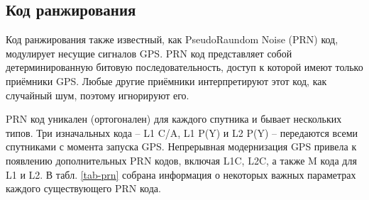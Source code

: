 \subsection*{\textbf{Код ранжирования}}

Код ранжирования также известный, как PseudoRaundom Noise (PRN) код, модулирует несущие сигналов GPS.
PRN код представляет собой детерминированную битовую последовательность, доступ к которой имеют только приёмники GPS.
Любые другие приёмники интерпретируют этот код, как случайный шум, поэтому игнорируют его.

PRN код уникален (ортогонален) для каждого спутника и бывает нескольких типов.
Три изначальных кода -- L1 C/A, L1 P(Y) и L2 P(Y) -- передаются всеми спутниками с момента запуска GPS. 
Непрерывная модернизация GPS привела к появлению дополнительных PRN кодов, включая L1C, L2C, а также M кода для L1 и L2.
В табл. \ref{tab-prn} собрана информация о некоторых важных параметрах каждого существующего PRN кода.
